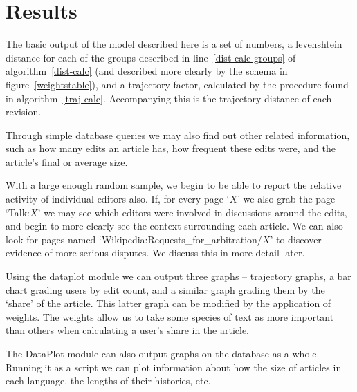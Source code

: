 \section{Results}
The basic output of the model described here is a set of numbers, a
levenshtein distance for each of the groups described in
line~\ref{dist-calc-groups} of algorithm~\ref{dist-calc} (and
described more clearly by the schema in figure~\ref{weightstable}),
and a trajectory factor, calculated by the procedure found in
algorithm~\ref{traj-calc}. Accompanying this is the trajectory
distance of each revision.

Through simple database queries we may also find out other related
information, such as how many edits an article has, how frequent these
edits were, and the article's final or average size.

With a large enough random sample, we begin to be able to report the
relative activity of individual editors also. If, for every page `$X$'
we also grab the page `Talk:$X$' we may see which editors were
involved in discussions around the edits, and begin to more clearly
see the context surrounding each article. We can also look for pages
named `Wikipedia:Requests\_for\_arbitration/$X$' to discover
evidence of more serious disputes. We discuss this in more detail
later.

Using the dataplot module we can output three graphs -- trajectory
graphs, a bar chart grading users by edit count, and a similar graph
grading them by the `share' of the article. This latter graph can be
modified by the application of weights. The weights allow us to take
some species of text as more important than others when calculating a
user's share in the article.

The DataPlot module can also output graphs on the database as a
whole. Running it as a script we can plot information about how the
size of articles in each language, the lengths of their histories,
etc. 
